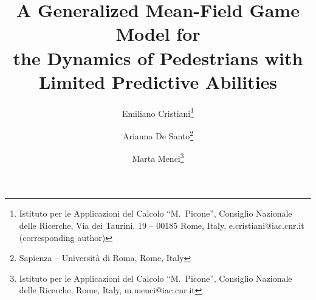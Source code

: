 \documentclass{cmslatex}
\begin{document}
%
\title{A Generalized Mean-Field Game Model 	for \\ the  
	Dynamics of Pedestrians with \\ Limited Predictive Abilities%
}


\author{
Emiliano Cristiani\thanks{
	Istituto per le Applicazioni del Calcolo ``M.\ Picone'', 
	Consiglio Nazionale delle Ricerche,
	Via dei Taurini, 19 --
	00185 Rome, Italy, 
	e.cristiani@iac.cnr.it (corresponding author)}
\and Arianna De Santo\thanks{
	Sapienza -- Universit\`a di Roma, Rome, Italy}
\and Marta Menci\thanks{
	Istituto per le Applicazioni del Calcolo ``M.\ Picone'', 
	Consiglio Nazionale delle Ricerche, Rome, Italy, 
	m.menci@iac.cnr.it
}
}




\pagestyle{myheadings} 


\maketitle
\end{document}
